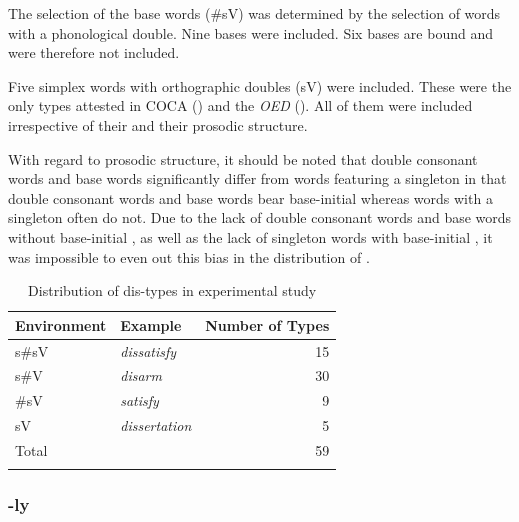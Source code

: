 The selection of the base words (\#sV) was determined by the selection of words with a phonological double. 
Nine bases were included. Six bases are bound and were therefore not included. 

Five simplex words with orthographic doubles (sV) were included. These were the only types attested in  {COCA} (\citealt{Davies.20082014}) and the \textit{OED} (\citealt{OED.2013}). 
All of them were included irrespective of their  and their prosodic structure. 

With regard to prosodic structure, it should be noted that double consonant words and base words significantly differ from words featuring a singleton in that double consonant words and base words bear base-initial  whereas words with a singleton often do not. Due to the lack of double consonant words and base words without base-initial , as well as the lack of singleton words with base-initial , it was impossible to even out this bias in the distribution of .


\begin{table}[h!]
	\caption{Distribution of dis-types in experimental study}
	\label{tbl:distribution of dis types in experiment}

	
		\begin{tabular} {llr}
\lsptoprule
			Environment & Example & Number of  Types\\

			\midrule
			s\#sV&\color{lsMidBlue}\textit{dissatisfy} & 15 \\ 
			s\#V&\color{lsMidBlue}\textit{disarm} & 30\\ 
			\#sV&\color{lsMidBlue}\textit{satisfy} & 9\\ 
			sV&\color{lsMidBlue}\textit{dissertation} & 5 \\ 
			\midrule   	
			Total&  & 59\\ 
			\lspbottomrule                                                                                
		\end{tabular}
	
\end{table}



\subsubsection{-ly} \label{stimuli ly}


